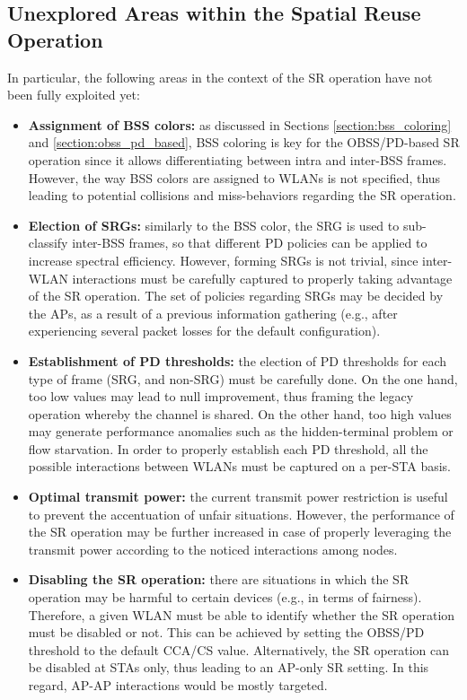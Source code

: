 \documentclass[preprint,12pt]{elsarticle}
\begin{document}
	\subsection{Unexplored Areas within the Spatial Reuse Operation}
	In particular, the following areas in the context of the SR operation have not been fully exploited yet:
	\begin{itemize}
		\item \textbf{Assignment of BSS colors:} as discussed in Sections \ref{section:bss_coloring} and \ref{section:obss_pd_based}, BSS coloring is key for the OBSS/PD-based SR operation since it allows differentiating between intra and inter-BSS frames. However, the way BSS colors are assigned to WLANs is not specified, thus leading to potential collisions and miss-behaviors regarding the SR operation.
		\item \textbf{Election of SRGs:} similarly to the BSS color, the SRG is used to sub-classify inter-BSS frames, so that different PD policies can be applied to increase spectral efficiency. However, forming SRGs is not trivial, since inter-WLAN interactions must be carefully captured to properly taking advantage of the SR operation. The set of policies regarding SRGs may be decided by the APs, as a result of a previous information gathering (e.g., after experiencing several packet losses for the default configuration).
		\item \textbf{Establishment of PD thresholds:} the election of PD thresholds for each type of frame (SRG, and non-SRG) must be carefully done. On the one hand, too low values may lead to null improvement, thus framing the legacy operation whereby the channel is shared. On the other hand, too high values may generate performance anomalies such as the hidden-terminal problem or flow starvation. In order to properly establish each PD threshold, all the possible interactions between WLANs must be captured on a per-STA basis.
		\item \textbf{Optimal transmit power:} the current transmit power restriction is useful to prevent the accentuation of unfair situations. However, the performance of the SR operation may be further increased in case of properly leveraging the transmit power according to the noticed interactions among nodes.
		\item \textbf{Disabling the SR operation:} there are situations in which the SR operation may be harmful to certain devices (e.g., in terms of fairness). Therefore, a given WLAN must be able to identify whether the SR operation must be disabled or not. This can be achieved by setting the OBSS/PD threshold to the default CCA/CS value. Alternatively, the SR operation can be disabled at STAs only, thus leading to an AP-only SR setting. In this regard, AP-AP interactions would be mostly targeted.
	\end{itemize}
	
\end{document}
